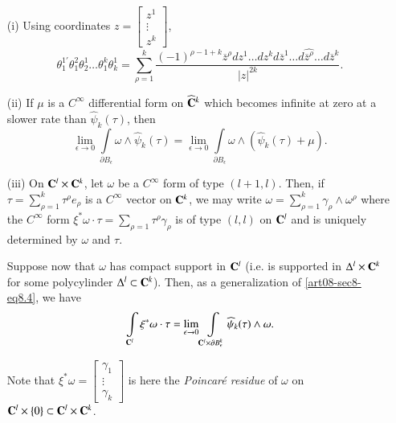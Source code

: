 \begin{remarks*}
\begin{itemize}
\item[(i)] Using coordinates $z=\left[\begin{smallmatrix} z^{1}\\ \vdots \\ z^{k}\end{smallmatrix}\right]$, 
\begin{equation}
\theta^{1'}_{1}\theta^{2}_{1}\theta^{1}_{2}\ldots\theta^{k}_{1}\theta^{1}_{k}=\sum\limits^{k}_{\rho=1}\frac{(-1)^{\rho-1+k}\overline{z}^{\rho}dz^{1}\ldots dz^{k}d\overline{z}^{1}\ldots d\widehat{\overline{z}^{\rho}}\ldots d\overline{z}^{k}}{|z|^{2k}}.\label{art08-sec8-eq8.8}
\end{equation}

\item[(ii)] If $\mu$ is a $C^{\infty}$ differential form on $\widehat{\mathbf{C}}^{k}$ which becomes infinite at zero at a slower rate than $\widehat{\psi}_{k}(\tau)$, then
\begin{equation}
\lim\limits_{\epsilon\to 0}\int\limits_{\partial B_{\epsilon}}\omega \wedge \widehat{\psi}_{k}(\tau)=\lim\limits_{\epsilon\to 0}\int\limits_{\partial B_{\epsilon}}\omega\wedge (\widehat{\psi}_{k}(\tau)+\mu).\label{art08-sec8-eq8.9}
\end{equation}

\item[(iii)] On $\mathbf{C}^{l}\times \mathbf{C}^{k}$, let $\omega$ be a $C^{\infty}$ form of type $(l+1,l)$. Then, if $\tau=\sum\limits^{k}_{\rho=1}\tau^{\rho}e_{\rho}$ is a $C^{\infty}$ vector on $\mathbf{C}^{k}$, we may write $\omega=\sum\limits^{k}_{\rho=1}\gamma_{\rho}\wedge \omega^{\rho}$ where the $C^{\infty}$ form $\xi^{*}\omega\cdot \tau=\sum\limits_{\rho=1}\tau^{\rho}\gamma_{\rho}$ is of type $(l,l)$ on $\mathbf{C}^{l}$ and is uniquely determined by $\omega$ and $\tau$.

Suppose now that $\omega$ has compact support in $\mathbf{C}^{l}$ (i.e. is supported in $\Delta^{l}\times \mathbf{C}^{k}$ for some polycylinder $\Delta^{l}\subset \mathbf{C}^{k}$). Then, as a generalization of \eqref{art08-sec8-eq8.4}, we have
\begin{equation}
\int\limits_{\mathbf{C}^{l}}\xi^{*}\omega\cdot \tau=\lim\limits_{\epsilon\to 0}\int\limits_{\mathbf{C}^{l}\times \partial B^{k}_{\epsilon}}\widehat{\psi}_{k}(\tau)\wedge \omega.\label{art08-sec8-eq8.10}
\end{equation}\pageoriginale

Note that $\xi^{*}\omega=\left[\begin{smallmatrix} \gamma_{1}\\ \vdots\\ \gamma_{k}\end{smallmatrix}\right]$ is here the {\em Poincar\'e residue} of $\omega$ on $\mathbf{C}^{l}\times \{0\}\subset \mathbf{C}^{l}\times \mathbf{C}^{k}$.


\end{itemize}
\end{remarks*}
